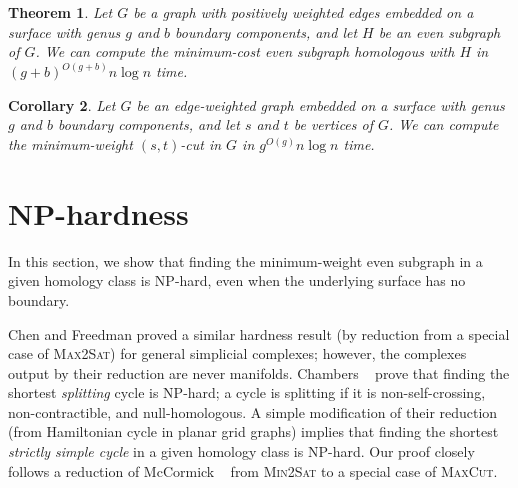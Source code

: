 \documentclass{sig-alternate}
\newtheorem{theorem}{Theorem}[section]
\newtheorem{corollary}[theorem]{Corollary}
\begin{document}
%
%
%


\begin{theorem}
Let $G$ be a graph with positively weighted edges embedded on a surface with genus
$g$ and $b$ boundary components, and let $H$ be an even subgraph of $G$.
We can compute the minimum-cost even subgraph homologous with $H$ in
$(g+b)^{O(g+b)} n\log n$ time.
\end{theorem}

\begin{corollary}
Let $G$ be an edge-weighted graph embedded on a surface with genus $g$ and $b$ boundary components, and let $s$ and $t$ be vertices of $G$.  We can compute the minimum-weight $(s,t)$-cut in $G$ in $g^{O(g)} n\log n$ time.
\end{corollary}



\section{{NP}-hardness}
\label{S:NP-hard}

In this section, we show that finding the minimum-weight even subgraph in a given homology class is {NP}-hard, even when the underlying surface has no boundary.

Chen and Freedman \cite{cf-qhc-08, cf-qhc2-07} proved a similar hardness result (by reduction from a special case of \textsc{Max2Sat}) for general simplicial complexes; however, the complexes output by their reduction are never manifolds.  Chambers \etal~\cite{ccelw-scsih-08} prove that finding the shortest \emph{splitting} cycle is {NP}-hard; a cycle is splitting if it is non-self-crossing, non-contractible, and null-homologous.  A simple modification of their reduction (from Hamiltonian cycle in planar grid graphs) implies that finding the shortest \emph{strictly simple cycle} in a given homology class is {NP}-hard.  Our proof closely follows a reduction of McCormick \etal~\cite{mrr-edofm-03} from \textsc{Min2Sat} to a special case of \textsc{MaxCut}.
\end{document}
